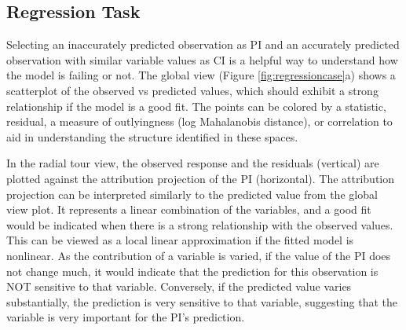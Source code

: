 \documentclass[
]{jss}
\begin{document}
\hypertarget{regression-task}{%
\subsection{Regression Task}\label{regression-task}}

Selecting an inaccurately predicted observation as PI and an accurately
predicted observation with similar variable values as CI is a helpful
way to understand how the model is failing or not. The global view
(Figure \ref{fig:regressioncase}a) shows a scatterplot of the observed
vs predicted values, which should exhibit a strong relationship if the
model is a good fit. The points can be colored by a statistic, residual,
a measure of outlyingness (log Mahalanobis distance), or correlation to
aid in understanding the structure identified in these spaces.

In the radial tour view, the observed response and the residuals
(vertical) are plotted against the attribution projection of the PI
(horizontal). The attribution projection can be interpreted similarly to
the predicted value from the global view plot. It represents a linear
combination of the variables, and a good fit would be indicated when
there is a strong relationship with the observed values. This can be
viewed as a local linear approximation if the fitted model is nonlinear.
As the contribution of a variable is varied, if the value of the PI does
not change much, it would indicate that the prediction for this
observation is NOT sensitive to that variable. Conversely, if the
predicted value varies substantially, the prediction is very sensitive
to that variable, suggesting that the variable is very important for the
PI's prediction.
\end{document}
